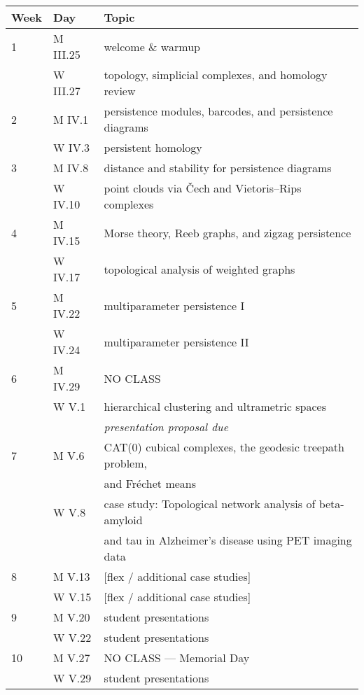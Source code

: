 \documentclass[11pt,twoside]{amsart}
\begin{document}
\begin{center}
\begin{longtable}{lll} \toprule
Week &Day &Topic\\ \midrule
1 &M III.25 &welcome \& warmup\\
&W III.27 &topology, simplicial complexes, and homology review\\ \midrule
2 &M IV.1 &persistence modules, barcodes, and persistence diagrams\\
&W IV.3 &persistent homology\\ \midrule
3 &M IV.8 &distance and stability for persistence diagrams\\
&W IV.10 &point clouds via \v{C}ech and Vietoris--Rips complexes\\ \midrule
4 &M IV.15 &Morse theory, Reeb graphs, and zigzag persistence\\
&W IV.17 &topological analysis of weighted graphs\\ \midrule
5 &M IV.22 &multiparameter persistence I\\
&W IV.24 &multiparameter persistence II\\ \midrule
6 &M IV.29 & NO CLASS\\
&W V.1 &hierarchical clustering and ultrametric spaces\\ 
&&\emph{presentation proposal due}\\ \midrule
7 &M V.6 &CAT(0) cubical complexes, the geodesic treepath problem,\\
&&and Fr\'echet means\\
&W V.8 &case study: Topological network analysis of beta-amyloid\\
&&and tau in Alzheimer’s disease using PET imaging data\\ \midrule
8 &M V.13 &[flex / additional case studies]\\
&W V.15 &[flex / additional case studies]\\ \midrule
9 &M V.20 &student presentations\\
&W V.22 &student presentations\\ \midrule
10 &M V.27 &NO CLASS --- Memorial Day\\
&W V.29 &student presentations\\ \bottomrule
\end{longtable}
\end{center}



\end{document}
